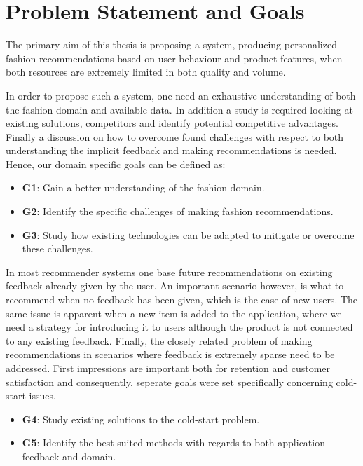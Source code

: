 \section{Problem Statement and Goals}

The primary aim of this thesis is proposing a system, producing personalized
fashion recommendations based on user behaviour and product features, when both
resources are extremely limited in both quality and volume.

In order to propose such a system, one need an exhaustive understanding of both
the fashion domain and available data. In addition a study is required looking
at existing solutions, competitors and identify potential competitive
advantages. Finally a discussion on how to overcome found challenges with
respect to both understanding the implicit feedback and making recommendations
is needed. Hence, our domain specific goals can be defined as:

\begin{itemize}
	\item \textbf{G1}: Gain a better understanding of the fashion domain.
  \item \textbf{G2}: Identify the specific challenges of making fashion recommendations.
  \item \textbf{G3}: Study how existing technologies can be adapted to mitigate or
  overcome these challenges.
\end{itemize}

In most recommender systems one base future recommendations on existing
feedback already given by the user. An important scenario however, is what to
recommend when no feedback has been given, which is the case of new users. The
same issue is apparent when a new item is added to the application, where we
need a strategy for introducing it to users although the product is not
connected to any existing feedback. Finally, the closely related problem of
making recommendations in scenarios where feedback is extremely sparse need to
be addressed. First impressions are important both for retention and customer
satisfaction and consequently, seperate goals were set specifically concerning
cold-start issues.

\begin{itemize}
  \item \textbf{G4}: Study existing solutions to the cold-start problem.
  \item \textbf{G5}: Identify the best suited methods with regards to both application
  feedback and domain.
\end{itemize}

